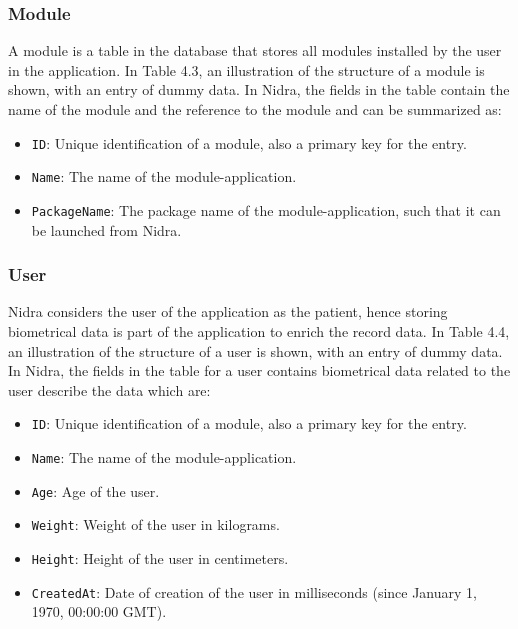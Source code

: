 \subsubsection{Module}
A module is a table in the database that stores all modules installed by the user in the application. In Table 4.3, an illustration of the structure of a module is shown, with an entry of dummy data. In Nidra, the fields in the table contain the name of the module and the reference to the module and can be summarized as: 
\begin{itemize}
    \item \verb|ID|: Unique identification of a module, also a primary key for the entry.
    \item \verb|Name|: The name of the module-application.
    \item \verb|PackageName|: The package name of the module-application, such that it can be launched from Nidra. 
\end{itemize}

\begin{table}
\begin{center}
\caption{Example entry in record table}
\end{center}
\end{table}


\subsubsection{User}
Nidra considers the user of the application as the patient, hence storing biometrical data is part of the application to enrich the record data. In Table 4.4, an illustration of the structure of a user is shown, with an entry of dummy data. In Nidra, the fields in the table for a user contains biometrical data related to the user describe the data which are:
\begin{itemize}
    \item \verb|ID|: Unique identification of a module, also a primary key for the entry.
    \item \verb|Name|: The name of the module-application.
    \item \verb|Age|: Age of the user.
    \item \verb|Weight|: Weight of the user in kilograms.
    \item \verb|Height|: Height of the user in centimeters.
    \item \verb|CreatedAt|: Date of creation of the user in milliseconds (since January 1, 1970, 00:00:00 GMT).
\end{itemize}

